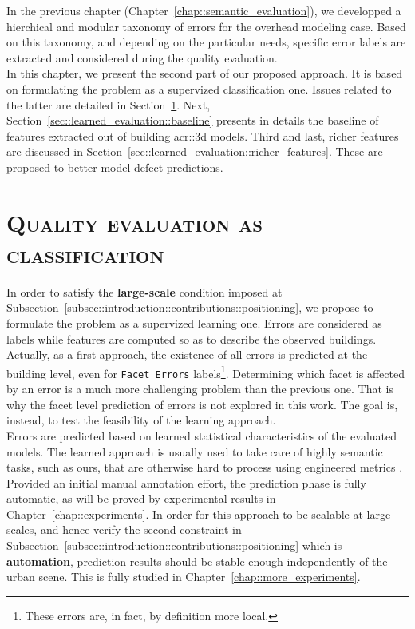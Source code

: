 \minitoc

\vfill

In the previous chapter (Chapter~\ref{chap::semantic_evaluation}), we developped a hierchical and modular taxonomy of errors for the overhead modeling case.
Based on this taxonomy, and depending on the particular needs, specific error labels are extracted and considered during the quality evaluation.\\
In this chapter, we present the second part of our proposed approach.
It is based on formulating the problem as a supervized classification one.
Issues related to the latter are detailed in Section~\ref{sec::learned_evaluation::classification}.
Next, Section~\ref{sec::learned_evaluation::baseline} presents in details the baseline of features extracted out of building \gls{acr::3d} models.
Third and last, richer features are discussed in Section~\ref{sec::learned_evaluation::richer_features}.
These are proposed to better model defect predictions.

\clearpage

\section{\textsc{Quality evaluation as classification}}
    \label{sec::learned_evaluation::classification}
    In order to satisfy the \textbf{large-scale} condition imposed at Subsection~\ref{subsec::introduction::contributions::positioning}, we propose to formulate the problem as a supervized learning one.
    Errors are considered as labels while features are computed so as to describe the observed buildings.
    Actually, as a first approach, the existence of all errors is predicted at the building level, even for \texttt{Facet Errors} labels\footnote{These errors are, in fact, by definition more local.}.
    Determining which facet is affected by an error is a much more challenging problem than the previous one.
    That is why the facet level prediction of errors is not explored in this work.
    The goal is, instead, to test the feasibility of the learning approach.\\

    Errors are predicted based on learned statistical characteristics of the evaluated models.
    The learned approach is usually used to take care of highly semantic tasks, such as ours, that are otherwise hard to process using engineered metrics \addref.\\
    Provided an initial manual annotation effort, the prediction phase is fully automatic, as will be proved by experimental results in Chapter~\ref{chap::experiments}.
    In order for this approach to be scalable at large scales, and hence verify the second constraint in Subsection~\ref{subsec::introduction::contributions::positioning} which is \textbf{automation}, prediction results should be stable enough independently of the urban scene.
    This is fully studied in Chapter~\ref{chap::more_experiments}.\\

